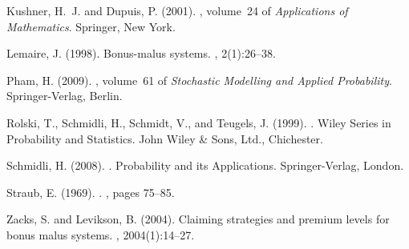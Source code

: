 \documentclass[a4paper]{scrartcl}
\theoremstyle{remark}
\theoremstyle{definition}
\numberwithin{equation}{section}
\begin{document}
\begin{thebibliography}{}
Kushner, H.~J. and Dupuis, P. (2001).
, volume~24 of {\em Applications of Mathematics}.
\newblock Springer, New York.

Lemaire, J. (1998).
\newblock Bonus-malus systems.
, 2(1):26--38.

Pham, H. (2009).
, volume~61 of {\em Stochastic Modelling and Applied Probability}.
\newblock Springer-Verlag, Berlin.

Rolski, T., Schmidli, H., Schmidt, V., and Teugels, J. (1999).
.
\newblock Wiley Series in Probability and Statistics. John Wiley \& Sons, Ltd., Chichester.

Schmidli, H. (2008).
.
\newblock Probability and its Applications. Springer-Verlag, London.

Straub, E. (1969).
.
, pages 75--85.

Zacks, S. and Levikson, B. (2004).
\newblock Claiming strategies and premium levels for bonus malus systems.
, 2004(1):14--27.

\end{thebibliography}


%
\end{document}

